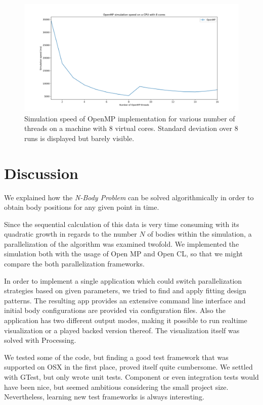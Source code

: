\documentclass[a4paper,11pt]{scrartcl} %
\begin{document}
\begin{figure}[h!]
  \centering
  \includegraphics[width=\textwidth]{img/benchmark_omp_8_cores.png}
  \caption{Simulation speed of OpenMP implementation for various number of threads on a machine with 8 virtual cores. Standard deviation over 8 runs is displayed but barely visible.}
  \label{fig:benchmark_openmp_8}
\end{figure}

\section{Discussion}

We explained how the \emph{N-Body Problem} can be solved algorithmically in order to obtain body positions for any given point in time.

Since the sequential calculation of this data is very time consuming with its quadratic growth in regards to the number $N$ of bodies within the simulation, a parallelization of the algorithm was examined twofold. We implemented the simulation both with the usage of Open MP and Open CL, so that we might compare the both parallelization frameworks.

In order to implement a single application which could switch parallelization strategies based on given parameters, we tried to find and apply fitting design patterns. The resulting app provides an extensive command line interface and initial body configurations are provided via configuration files. Also the application has two different output modes, making it possible to run realtime visualization or a played backed version thereof. The visualization itself was solved with Processing.

We tested some of the code, but finding a good test framework that was supported on OSX in the first place, proved itself quite cumbersome. We settled with GTest, but only wrote unit tests. Component or even integration tests would have been nice, but seemed ambitious considering the small project size. Nevertheless, learning new test frameworks is always interesting.
\end{document}
